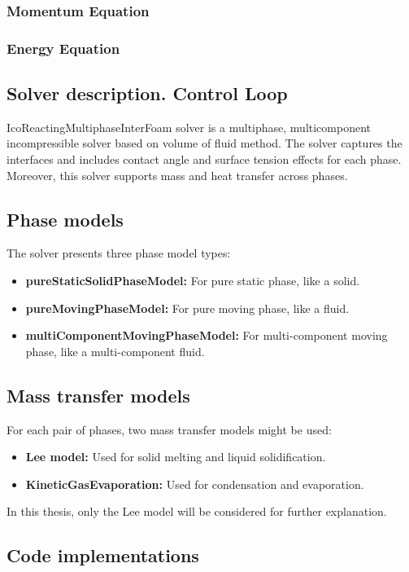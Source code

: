\subsubsection{Momentum Equation}

\subsubsection{Energy Equation}

\subsection{Solver description. Control Loop}
IcoReactingMultiphaseInterFoam solver is a multiphase, multicomponent incompressible solver based on volume of fluid method. The solver captures the interfaces and includes contact angle and surface tension effects for each phase. Moreover, this solver supports mass and heat transfer across phases.
\subsection{Phase models}
The solver presents three phase model types:
\begin{itemize}
	\item \textbf{pureStaticSolidPhaseModel:} For pure static phase, like a solid.
	\item \textbf{pureMovingPhaseModel:} For pure moving phase, like a fluid.
	\item \textbf{multiComponentMovingPhaseModel:} For multi-component moving phase, like a multi-component fluid.
\end{itemize}
\subsection{Mass transfer models}
For each pair of phases, two mass transfer models might be used:
\begin{itemize}
	\item \textbf{Lee model:} Used for solid melting and liquid solidification.
	\item \textbf{KineticGasEvaporation:} Used for condensation and evaporation.
\end{itemize}
In this thesis, only the Lee model will be considered for further explanation.







\subsection{Code implementations}
